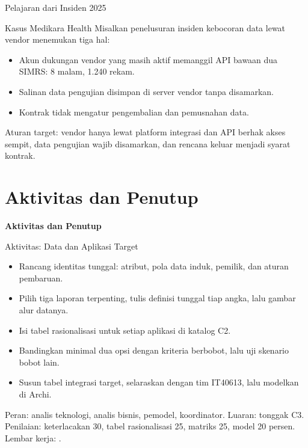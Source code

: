 \documentclass[aspectratio=169, table, 12pt]{beamer}
\begin{document}
\begin{frame}{{\Large Pelajaran dari Insiden 2025}}
  \begin{block}{Kasus Medikara Health}
    \small
    Misalkan penelusuran insiden kebocoran data lewat vendor menemukan tiga hal:
    \begin{itemize}
      \item Akun dukungan vendor yang masih aktif memanggil API bawaan dua SIMRS: 8 malam, 1.240 rekam.
      \item Salinan data pengujian disimpan di server vendor tanpa disamarkan.
      \item Kontrak tidak mengatur pengembalian dan pemusnahan data.
    \end{itemize}
    \vspace{4pt}
    Aturan target: vendor hanya lewat platform integrasi dan API berhak akses sempit, data pengujian
    wajib disamarkan, dan rencana keluar menjadi syarat kontrak.
  \end{block}
\end{frame}

\section{Aktivitas dan Penutup}

\begin{frame}{\hfill}
  \centering
  \Huge{\textbf{Aktivitas dan Penutup}}
\end{frame}

\begin{frame}{{\Large Aktivitas: Data dan Aplikasi Target}}
  \small
  \begin{itemize}
    \item Rancang identitas tunggal: atribut, pola data induk, pemilik, dan aturan pembaruan.
    \item Pilih tiga laporan terpenting, tulis definisi tunggal tiap angka, lalu gambar alur datanya.
    \item Isi tabel rasionalisasi untuk setiap aplikasi di katalog C2.
    \item Bandingkan minimal dua opsi dengan kriteria berbobot, lalu uji skenario bobot lain.
    \item Susun tabel integrasi target, selaraskan dengan tim IT40613, lalu modelkan di Archi.
  \end{itemize}
  \footnotesize Peran: analis teknologi, analis bisnis, pemodel, koordinator. Luaran: tonggak C3.
  Penilaian: keterlacakan 30, tabel rasionalisasi 25, matriks 25, model 20 persen.
  Lembar kerja: .
\end{frame}
\end{document}
